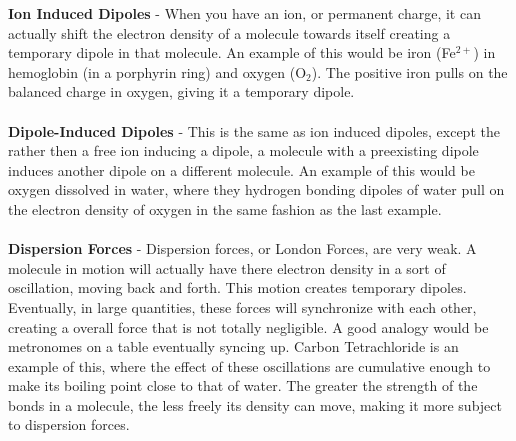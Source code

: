 \documentclass{article}
\begin{document}
\begin{minipage}[c]{0.6\textwidth}
\end{minipage}

\vspace{10pt}
\noindent \textbf{Ion Induced Dipoles} - When you have an ion, or permanent charge, it can actually shift the electron density of a molecule towards itself creating a temporary dipole in that molecule. An example of this would be iron (Fe$^{2+}$) in hemoglobin (in a porphyrin ring) and oxygen (O$_{2}$). The positive iron pulls on the balanced charge in oxygen, giving it a temporary dipole.\\
\\
\textbf{Dipole-Induced Dipoles} - This is the same as ion induced dipoles, except the rather then a free ion inducing a dipole, a molecule with a preexisting dipole induces another dipole on a different molecule. An example of this would be oxygen dissolved in water, where they hydrogen bonding dipoles of water pull on the electron density of oxygen in the same fashion as the last example.\\
\\
\textbf{Dispersion Forces} - Dispersion forces, or London Forces, are very weak. A molecule in motion will actually have there electron density in a sort of oscillation, moving back and forth. This motion creates temporary dipoles. Eventually, in large quantities, these forces will synchronize with each other, creating a overall force that is not totally negligible.  A good analogy would be metronomes on a table eventually syncing up. Carbon Tetrachloride is an example of this, where the effect of these oscillations are cumulative enough to make its boiling point close to that of water. The greater the strength of the bonds in a molecule, the less freely its density can move, making it more subject to dispersion forces.\\
\\
\pagebreak 
\end{document}
